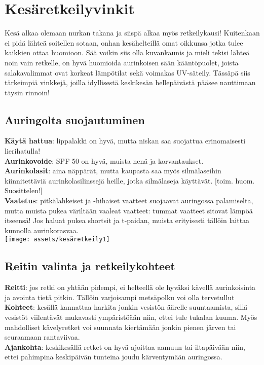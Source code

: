 \section{Kesäretkeilyvinkit}

\begin{multicols}{2}

Kesä alkaa olemaan nurkan takana ja siispä alkaa myös retkeilykausi! Kuitenkaan ei pidä lähteä soitellen sotaan, onhan kesähelteillä omat oikkunsa jotka tulee kaikkien ottaa huomioon. Sää voikin siis olla kuvankaunis ja mieli tekisi lähteä noin vain retkelle, on hyvä huomioida aurinkoisen sään kääntöpuolet, joista salakavalimmat ovat korkeat lämpötilat sekä voimakas UV-säteily. Tässäpä siis tärkeimpiä vinkkejä, joilla idyllisestä keskikesän hellepäivästä pääsee nauttimaan täysin rinnoin!

\subsection*{Auringolta suojautuminen}

\textbf{Käytä hattua}: lippalakki on hyvä, mutta niskan saa suojattua erinomaisesti lierihatulla!\\
\textbf{Aurinkovoide}: SPF 50 on hyvä, muista nenä ja korvantaukset.\\
\textbf{Aurinkolasit}: aina näppärät, mutta kaupasta saa myös silmälaseihin kiinnitettäviä aurinkolasilinssejä heille, jotka silmälaseja käyttävät. [toim. huom. Suosittelen!]\\
\textbf{Vaatetus}: pitkälahkeiset ja -hihaiset vaatteet suojaavat auringossa palamiselta, mutta muista pukea väriltään vaaleat vaatteet: tummat vaatteet sitovat lämpöä itseensä! Jos haluat pukea shortsit ja t-paidan, muista erityisesti tällöin laittaa kunnolla aurinkorasvaa.\\

{\centering\texttt{[image: assets/kesäretkeily1]}}

\subsection*{Reitin valinta ja retkeilykohteet}

\textbf{Reitti}: jos retki on yhtään pidempi, ei helteellä ole hyväksi kävellä aurinkoisinta ja avointa tietä pitkin. Tällöin varjoisampi metsäpolku voi olla tervetullut\\
\textbf{Kohteet}: kesällä kannattaa harkita jonkin vesistön äärelle suuntaamista, sillä vesistöt viilentävät mukavasti ympäristöään niin, ettei tule tukalan kuuma. Myös mahdolliset kävelyretket voi suunnata kiertämään jonkin pienen järven tai seuraamaan rantaviivaa.\\
\textbf{Ajankohta}: keskikesällä retket on hyvä ajoittaa aamuun tai iltapäivään niin, ettei pahimpina keskipäivän tunteina joudu kärventymään auringossa. \\


\end{multicols}
